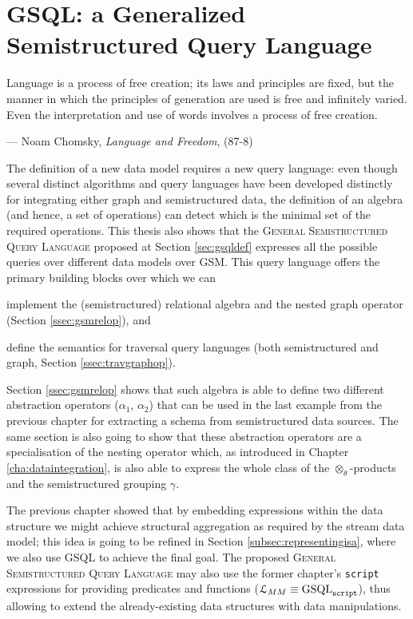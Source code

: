 \chapter{GSQL: a Generalized Semistructured Query Language}\label{cha:NGQL}
\epigraph{Language is a process of free creation; its laws and principles are fixed, but the manner in which the principles of generation are used is free and infinitely varied. Even the interpretation and use of words involves a process of free creation.}{--- Noam Chomsky, \textit{Language and Freedom}, (87-8)}

 

The definition of a new data model requires a new query language: even though several distinct algorithms and query languages have been developed distinctly for integrating either graph and semistructured data, the definition of an algebra (and hence, a set of operations) can detect which is the minimal set of the required operations. This thesis also shows that the  \textsc{General Semistructured Query Language} proposed at Section \ref{sec:gsqldef} expresses all the possible queries over different data models over GSM. This query language offers the primary building blocks over which we can \begin{mylist}
	\item implement the (semistructured) relational algebra and the nested graph operator (Section \vref{ssec:gsmrelop}), and
	\item define the semantics for traversal query languages (both semistructured and graph, Section \vref{ssec:travgraphop}).
\end{mylist} Section \vref{ssec:gsmrelop} shows that such algebra is able to define two different abstraction operators ($\alpha_1$, $\alpha_2$) that can be used in the last example from the previous chapter for extracting a schema from semistructured data sources. The same section is also going to show that these abstraction operators are a specialisation of the nesting operator which, as introduced in Chapter \ref{cha:dataintegration}, is also able to express the whole class of the $\otimes_\theta$-products and the semistructured grouping $\gamma$.

The previous chapter showed that by embedding expressions within the data structure we might achieve structural aggregation as required by the stream data model; this idea is going to be refined in Section \ref{subsec:representingisa}, where we also use GSQL to achieve the final goal. The proposed \textsc{General Semistructured Query Language}  may also use the former chapter's \texttt{script} expressions for providing predicates and functions ($\langg_{\metamodel}\equiv \textup{GSQL}_{\texttt{script}}$), thus  allowing to extend the already-existing data structures with data manipulations.

